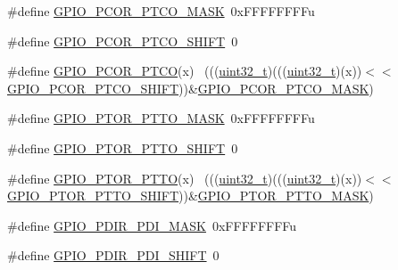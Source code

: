 \begin{DoxyCompactItemize}
\item 
\#define \hyperlink{group___g_p_i_o___register___masks_ga0b8378768ee61ea2c685a1687c90fa03}{G\+P\+I\+O\+\_\+\+P\+C\+O\+R\+\_\+\+P\+T\+C\+O\+\_\+\+M\+A\+SK}~0x\+F\+F\+F\+F\+F\+F\+F\+Fu
\item 
\#define \hyperlink{group___g_p_i_o___register___masks_ga5c9203b830cbd86cd8d0189872b5c772}{G\+P\+I\+O\+\_\+\+P\+C\+O\+R\+\_\+\+P\+T\+C\+O\+\_\+\+S\+H\+I\+FT}~0
\item 
\#define \hyperlink{group___g_p_i_o___register___masks_ga3435ac6150be0f65562e575f41463272}{G\+P\+I\+O\+\_\+\+P\+C\+O\+R\+\_\+\+P\+T\+CO}(x)                                            ~(((\hyperlink{_p_e___types_8h_a33594304e786b158f3fb30289278f5af}{uint32\+\_\+t})(((\hyperlink{_p_e___types_8h_a33594304e786b158f3fb30289278f5af}{uint32\+\_\+t})(x))$<$$<$\hyperlink{group___g_p_i_o___register___masks_ga5c9203b830cbd86cd8d0189872b5c772}{G\+P\+I\+O\+\_\+\+P\+C\+O\+R\+\_\+\+P\+T\+C\+O\+\_\+\+S\+H\+I\+FT}))\&\hyperlink{group___g_p_i_o___register___masks_ga0b8378768ee61ea2c685a1687c90fa03}{G\+P\+I\+O\+\_\+\+P\+C\+O\+R\+\_\+\+P\+T\+C\+O\+\_\+\+M\+A\+SK})
\item 
\#define \hyperlink{group___g_p_i_o___register___masks_gaa75953b5d9d23bdaa6c24232e1a52680}{G\+P\+I\+O\+\_\+\+P\+T\+O\+R\+\_\+\+P\+T\+T\+O\+\_\+\+M\+A\+SK}~0x\+F\+F\+F\+F\+F\+F\+F\+Fu
\item 
\#define \hyperlink{group___g_p_i_o___register___masks_ga70e5442b3a119665aafb9e6e5b48bbd5}{G\+P\+I\+O\+\_\+\+P\+T\+O\+R\+\_\+\+P\+T\+T\+O\+\_\+\+S\+H\+I\+FT}~0
\item 
\#define \hyperlink{group___g_p_i_o___register___masks_gad89d527b4c87f933192b313f79f96438}{G\+P\+I\+O\+\_\+\+P\+T\+O\+R\+\_\+\+P\+T\+TO}(x)                                            ~(((\hyperlink{_p_e___types_8h_a33594304e786b158f3fb30289278f5af}{uint32\+\_\+t})(((\hyperlink{_p_e___types_8h_a33594304e786b158f3fb30289278f5af}{uint32\+\_\+t})(x))$<$$<$\hyperlink{group___g_p_i_o___register___masks_ga70e5442b3a119665aafb9e6e5b48bbd5}{G\+P\+I\+O\+\_\+\+P\+T\+O\+R\+\_\+\+P\+T\+T\+O\+\_\+\+S\+H\+I\+FT}))\&\hyperlink{group___g_p_i_o___register___masks_gaa75953b5d9d23bdaa6c24232e1a52680}{G\+P\+I\+O\+\_\+\+P\+T\+O\+R\+\_\+\+P\+T\+T\+O\+\_\+\+M\+A\+SK})
\item 
\#define \hyperlink{group___g_p_i_o___register___masks_gacb7c8cc976937906c8e803811a7fbb68}{G\+P\+I\+O\+\_\+\+P\+D\+I\+R\+\_\+\+P\+D\+I\+\_\+\+M\+A\+SK}~0x\+F\+F\+F\+F\+F\+F\+F\+Fu
\item 
\#define \hyperlink{group___g_p_i_o___register___masks_ga99fd9212dd769bb1964a28a864c6c741}{G\+P\+I\+O\+\_\+\+P\+D\+I\+R\+\_\+\+P\+D\+I\+\_\+\+S\+H\+I\+FT}~0

\end{DoxyCompactItemize}
